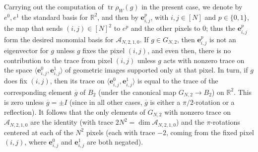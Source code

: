 \documentclass{article}
\theoremstyle{definition}
\begin{document}
Carrying out the computation of $\operatorname{tr}\rho_W(g)$ in the present case, we denote by $e^0,e^1$ the standard basis for $\mathbb{R}^2$, and then by $\mathbf{e}_{i,j}^p$, with $i,j\in [N]$ and $p\in \{0,1\}$, the map that sends $(i,j)\in [N]^2$ to $e^p$ and the other pixels to 0; thus the $\mathbf{e}_{i,j}^p$ form the desired monomial basis for $\mathcal{A}_{N,2,1,0}$. If $g\in G_{N,2}$, then $\mathbf{e}_{i,j}^p$ is not an eigenvector for $g$ unless $g$ fixes the pixel $(i,j)$, and even then, there is no contribution to the trace from pixel $(i,j)$ unless $g$ acts with nonzero trace on the space $\langle\mathbf{e}_{i,j}^0,\mathbf{e}_{i,j}^1 \rangle$ of geometric images supported only at that pixel. In turn, if $g$ does fix $(i,j)$, then its trace on $\langle\mathbf{e}_{i,j}^0,\mathbf{e}_{i,j}^1 \rangle$ is equal to the trace of the corresponding element $\overline g$ of $B_2$ (under the canonical map $G_{N,2}\rightarrow B_2$) on $\mathbb{R}^2$. This is zero unless $\overline g = \pm I$ (since in all other cases, $\overline g$ is either a $\pi/2$-rotation or a reflection). It follows that the only elements of $G_{N,2}$ with nonzero trace on $\mathcal{A}_{N,2,1,0}$ are the identity (with trace $2N^2 = \dim \mathcal{A}_{N,2,1,0}$) and the $\pi$-rotations centered at each of the $N^2$ pixels (each with trace $-2$, coming from the fixed pixel $(i,j)$, where $\mathbf{e}_{i,j}^0$ and $\mathbf{e}_{i,j}^1$ are both negated). 
\end{document}
